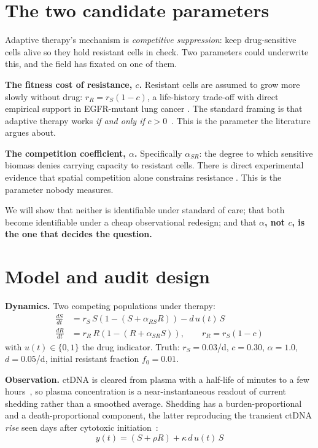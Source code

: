 \documentclass[11pt,a4paper]{article}
\newcommand{\aSR}{\alpha_{SR}}
\newcommand{\aRS}{\alpha_{RS}}
\begin{document}
\section{The two candidate parameters}

Adaptive therapy's mechanism is \emph{competitive suppression}: keep drug-sensitive
cells alive so they hold resistant cells in check. Two parameters could underwrite
this, and the field has fixated on one of them.

\textbf{The fitness cost of resistance, $c$.} Resistant cells are assumed to grow
more slowly without drug: $r_R = r_S(1-c)$, a life-history trade-off
\citep{aktipis2013life} with direct empirical support in EGFR-mutant lung cancer
\citep{chmielecki2011optimization}. The standard framing is that adaptive therapy
works \emph{if and only if} $c > 0$~\citep{gatenby2009adaptive}. This is the
parameter the literature argues about.

\textbf{The competition coefficient, $\alpha$.} Specifically $\aSR$: the degree to
which sensitive biomass denies carrying capacity to resistant cells. There is direct
experimental evidence that spatial competition alone constrains resistance
\citep{bacevic2017spatial}. This is the parameter nobody measures.

We will show that neither is identifiable under standard of care; that both become
identifiable under a cheap observational redesign; and that \textbf{$\alpha$, not
$c$, is the one that decides the question.}

\section{Model and audit design}

\textbf{Dynamics.} Two competing populations under therapy:
\begin{align}
\frac{dS}{dt} &= r_S\, S \left(1 - (S + \aRS R)\right) - d\, u(t)\, S\\
\frac{dR}{dt} &= r_R\, R \left(1 - (R + \aSR S)\right), \qquad r_R = r_S(1-c)
\end{align}
with $u(t) \in \{0,1\}$ the drug indicator. Truth: $r_S = 0.03$/d, $c = 0.30$,
$\alpha = 1.0$, $d = 0.05$/d, initial resistant fraction $f_0 = 0.01$.

\textbf{Observation.} ctDNA is cleared from plasma with a half-life of minutes to
a few hours~\citep{lo1999rapid,diehl2008circulating,esmo2022ctdna}, so plasma
concentration is a near-instantaneous readout of current shedding rather than a
smoothed average. Shedding has a burden-proportional and a death-proportional
component, the latter reproducing the transient ctDNA \emph{rise} seen days after
cytotoxic initiation~\citep{esmo2022ctdna}:
\begin{equation}
y(t) = (S + \rho R) + \kappa\, d\, u(t)\, S
\end{equation}
\end{document}
